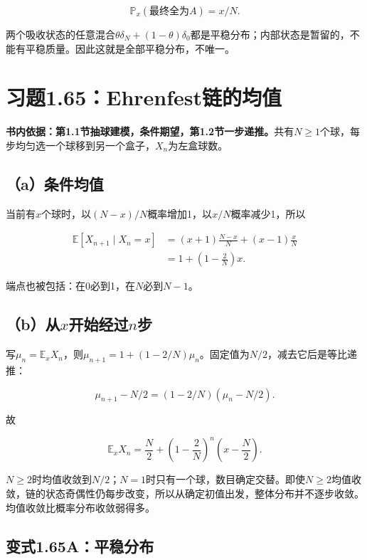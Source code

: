 \documentclass[
  11pt,a4paper,UTF8,fontset=fandol]{ctexart}
\begin{document}
\[\boxed{\mathbb P_x(\text{最终全为}A)=x/N.}\]

两个吸收状态的任意混合\(\theta\delta_N+(1-\theta)\delta_0\)都是平稳分布；内部状态是暂留的，不能有平稳质量。因此这就是全部平稳分布，不唯一。

\section{习题1.65：Ehrenfest链的均值}\label{ux4e60ux98981.65ehrenfestux94feux7684ux5747ux503c}

\textbf{书内依据：第1.1节抽球建模，条件期望，第1.2节一步递推。}共有\(N\ge1\)个球，每步均匀选一个球移到另一个盒子，\(X_n\)为左盒球数。

\subsection{（a）条件均值}\label{aux6761ux4ef6ux5747ux503c}

当前有\(x\)个球时，以\((N-x)/N\)概率增加1，以\(x/N\)概率减少1，所以

\[
\begin{aligned}
\mathbb E[X_{n+1}\mid X_n=x]
&=(x+1)\frac{N-x}{N}+(x-1)\frac{x}{N}\\
&=1+\left(1-\frac2N\right)x.
\end{aligned}
\]

端点也被包括：在0必到1，在\(N\)必到\(N-1\)。

\subsection{\texorpdfstring{（b）从\(x\)开始经过\(n\)步}{（b）从x开始经过n步}}\label{bux4ecexux5f00ux59cbux7ecfux8fc7nux6b65}

写\(\mu_n=\mathbb E_xX_n\)，则\(\mu_{n+1}=1+(1-2/N)\mu_n\)。固定值为\(N/2\)，减去它后是等比递推：

\[\mu_{n+1}-N/2=(1-2/N)(\mu_n-N/2).\]

故

\[\boxed{\mathbb E_xX_n=\frac N2+\left(1-\frac2N\right)^n\left(x-\frac N2\right).}\]

\(N\ge2\)时均值收敛到\(N/2\)；\(N=1\)时只有一个球，数目确定交替。即使\(N\ge2\)均值收敛，链的状态奇偶性仍每步改变，所以从确定初值出发，整体分布并不逐步收敛。均值收敛比概率分布收敛弱得多。

\subsection{变式1.65A：平稳分布}\label{ux53d8ux5f0f1.65aux5e73ux7a33ux5206ux5e03}
\end{document}
